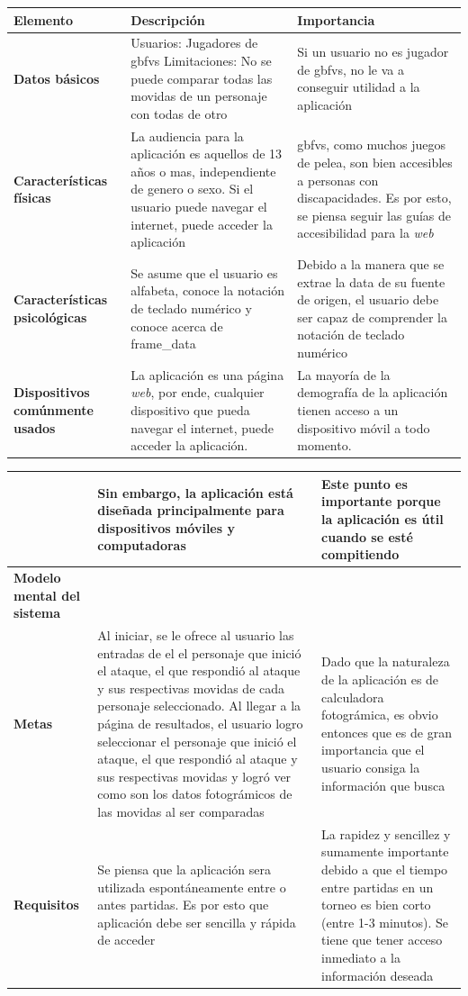 

\begin{tabularx}{\textwidth}{| X | X | X |}
    \hline \textbf{Elemento} & \textbf{Descripción} & \textbf{Importancia} \\
    \hline \textbf{Datos básicos} & Usuarios: Jugadores de \gls{gbfvs} \newline Limitaciones: No se puede comparar todas las movidas de un personaje con todas de otro  & Si un usuario no es jugador de \gls{gbfvs}, no le va a conseguir utilidad a la aplicación\\
    \hline \textbf{Características físicas} & La audiencia para la aplicación es aquellos de 13 años o mas, independiente de genero o sexo. Si el usuario puede navegar el internet, puede acceder la aplicación & \gls{gbfvs}, como muchos juegos de pelea, son bien accesibles a personas con discapacidades. Es por esto, se piensa seguir las guías de accesibilidad para la \textit{web}\\ 
    \hline \textbf{Características psicológicas} & Se asume que el usuario es alfabeta, conoce la notación de teclado numérico \cite{noauthor_numpad_nodate} y conoce acerca de \gls{frame_data} & Debido a la manera que se extrae la data de su fuente de origen, el usuario debe ser capaz de comprender la notación de teclado numérico\\
    \hline \textbf{Dispositivos comúnmente usados} & La aplicación es una página \textit{web}, por ende, cualquier dispositivo que pueda navegar el internet, puede acceder la aplicación.  & La mayoría de la demografía de la aplicación tienen acceso a un dispositivo móvil a todo momento. \\
\end{tabularx}

\begin{tabularx}{\textwidth}{| X |  X |  X |}
    & Sin embargo, la aplicación está diseñada principalmente para dispositivos móviles y computadoras & Este punto es importante porque la aplicación es útil cuando se esté compitiendo\\
    \hline \textbf{Modelo mental del sistema} &  & \\ 
    \hline \textbf{Metas} & Al iniciar, se le ofrece al usuario las entradas de el el personaje que inició el ataque, el que respondió al ataque y sus respectivas movidas de cada personaje seleccionado. Al llegar a la página de resultados, el usuario logro seleccionar el personaje que inició el ataque, el que respondió al ataque y sus respectivas movidas y logró ver como son los datos fotográmicos de las movidas al ser comparadas & Dado que la naturaleza de la aplicación es de calculadora fotográmica, es obvio entonces que es de gran importancia que el usuario consiga la información que busca \\ 
    \hline \textbf{Requisitos} & Se piensa que la aplicación sera utilizada espontáneamente entre o antes partidas. Es por esto que aplicación debe ser sencilla y rápida de acceder & La rapidez y sencillez y sumamente importante debido a que el tiempo entre partidas en un torneo es bien corto (entre 1-3 minutos). Se tiene que tener acceso inmediato a la información deseada\\ 
    \hline
\end{tabularx}

